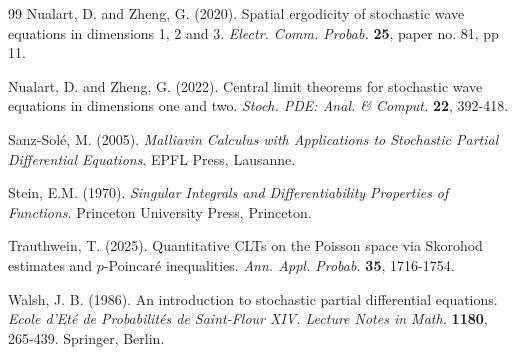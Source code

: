 \documentclass[12pt]{article}
\begin{document}
\begin{thebibliography}{99}
 Nualart, D. and Zheng, G. (2020). Spatial ergodicity of stochastic wave equations in dimensions 1, 2 and 3. {\em Electr. Comm. Probab.} {\bf 25}, paper no. 81, pp 11.


 Nualart, D. and Zheng, G. (2022). Central limit theorems for stochastic wave equations in dimensions one and two. {\em Stoch. PDE: Anal. \& Comput.} {\bf 22}, 392-418.
    
 Sanz-Sol\'e, M. (2005). {\em Malliavin Calculus with Applications to Stochastic Partial Differential Equations}. EPFL Press, Lausanne.    
    
 Stein, E.M. (1970). {\em Singular Integrals and Differentiability Properties of Functions}. Princeton University Press, Princeton.
    
 Trauthwein, T. (2025). Quantitative CLTs on the Poisson space via Skorohod estimates and $p$-Poincar\'e inequalities. {\em Ann. Appl. Probab.} {\bf 35}, 1716-1754.

 Walsh, J. B. (1986). An introduction to stochastic
partial differential equations. {\em Ecole d'Et\'{e} de
Probabilit\'{e}s de Saint-Flour XIV. Lecture Notes in Math.} {\bf
1180}, 265-439. Springer, Berlin.

\end{thebibliography}
\end{document}
